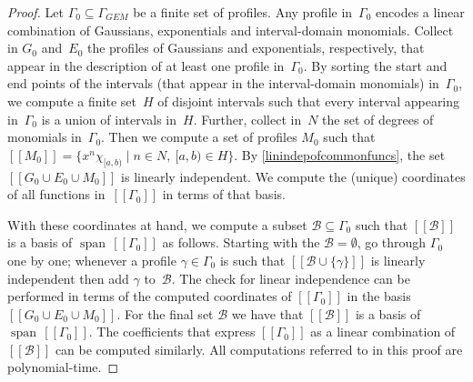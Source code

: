 \documentclass[a4paper,UKenglish,cleveref, autoref,mathscr]{lipics-v2019}
\newcommand{\1}{\mathbbm{1}}
\newcommand{\pl}{\Gamma_{\mathit{GEM}}}
\DeclareMathOperator{\Span}{span\,}
\begin{document}
\begin{proof}
Let $\Gamma_0 \subseteq \pl$ be a finite set of profiles.
Any profile in~$\Gamma_0$ encodes a linear combination of Gaussians, exponentials and interval-domain monomials.
Collect in $G_0$ and~$E_0$ the profiles of Gaussians and exponentials, respectively, that appear in the description of at least one profile in~$\Gamma_0$.
By sorting the start and end points of the intervals (that appear in the interval-domain monomials) in~$\Gamma_0$, we compute a finite set~$H$ of disjoint intervals such that every interval appearing in~$\Gamma_0$ is a union of intervals in~$H$.
Further, collect in~$N$ the set of degrees of monomials in~$\Gamma_0$.
Then we compute a set of profiles $M_0$ such that $[\![M_0]\!] = \{x^n \chi_{[a,b)} \mid n \in N,\ [a,b) \in H\}$.
By \cref{linindepofcommonfuncs}, the set $[\![G_0 \cup E_0 \cup M_0]\!]$ is linearly independent.
We compute the (unique) coordinates of all functions in~$[\![\Gamma_0]\!]$ in terms of that basis.

With these coordinates at hand, we compute a subset $\mathcal{B} \subseteq \Gamma_0$ such that $[\![\mathcal{B}]\!]$ is a basis of $\Span [\![\Gamma_0]\!]$ as follows.
Starting with the $\mathcal{B} = \emptyset$, go through $\Gamma_0$ one by one; whenever a profile $\gamma \in \Gamma_0$ is such that $[\![\mathcal{B} \cup \{\gamma\}]\!]$ is linearly independent then add $\gamma$ to~$\mathcal{B}$.
The check for linear independence can be performed in terms of the computed coordinates of $[\![\Gamma_0]\!]$ in the basis $[\![G_0 \cup E_0 \cup M_0]\!]$.
For the final set $\mathcal{B}$ we have that $[\![\mathcal{B}]\!]$ is a basis of $\Span [\![\Gamma_0]\!]$.
The coefficients that express $[\![\Gamma_0]\!]$ as a linear combination of~$[\![\mathcal{B}]\!]$ can be computed similarly.
All computations referred to in this proof are polynomial-time.
\end{proof}
\end{document}
